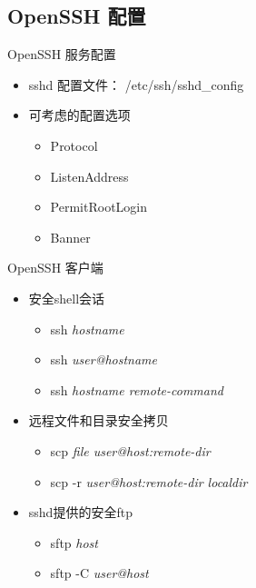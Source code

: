 \subsection{OpenSSH 配置}



\begin{frame}{OpenSSH 服务配置}
\begin{itemize}
\item sshd 配置文件： /etc/ssh/sshd\_config
\item 可考虑的配置选项

\begin{itemize}
\item Protocol
\item ListenAddress
\item PermitRootLogin
\item Banner
\end{itemize}
\end{itemize}

\end{frame} 
\begin{frame}{OpenSSH 客户端}
\begin{itemize}
\item 安全shell会话

\begin{itemize}
\item ssh \emph{hostname}
\item ssh \emph{user@hostname}
\item ssh \emph{hostname remote-command}
\end{itemize}
\item 远程文件和目录安全拷贝

\begin{itemize}
\item scp\emph{ file user@host:remote-dir}
\item scp -r \emph{user@host:remote-dir localdir}
\end{itemize}
\item sshd提供的安全ftp

\begin{itemize}
\item sftp \emph{host}
\item sftp -C \emph{user@host}
\end{itemize}
\end{itemize}

\end{frame} 
